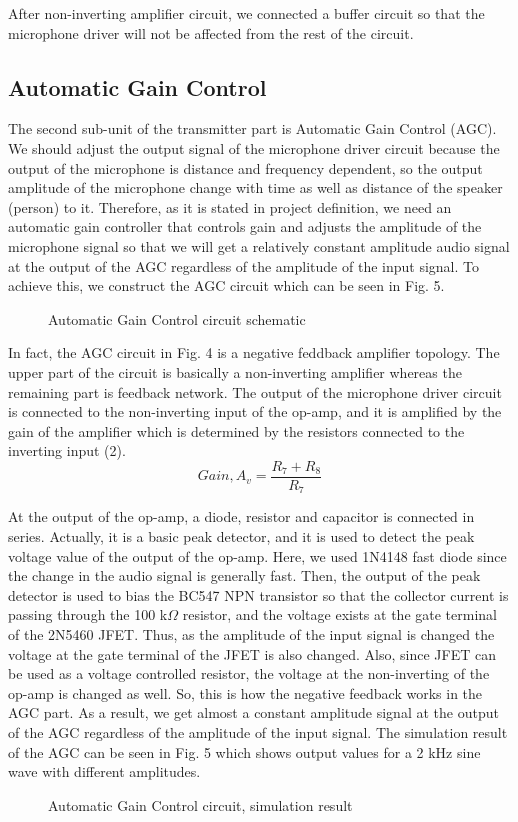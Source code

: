 \documentclass[conference]{IEEEtran}
\begin{document}
\par After non-inverting amplifier circuit, we connected a buffer circuit so that the microphone driver will not be affected from the rest of the circuit. 
\subsection{Automatic Gain Control}
The second sub-unit of the transmitter part is Automatic Gain Control (AGC). We should adjust the output signal of the microphone driver circuit because the output of the microphone is distance and frequency dependent, so the output amplitude of the microphone change with time as well as distance of the speaker (person) to it. Therefore, as it is stated in project definition, we need an automatic gain controller that controls gain and adjusts the amplitude of the microphone signal so that we will get a relatively constant amplitude audio signal at the output of the AGC regardless of the amplitude of the input signal. To achieve this, we construct the AGC circuit which can be seen in Fig. 5.
 \begin{figure}[H]
   \centerline{}
    \caption{Automatic Gain Control circuit schematic}
\end{figure}
\par In fact, the AGC circuit in Fig. 4 is a negative feddback amplifier topology. The upper part of the circuit is basically a non-inverting amplifier whereas the remaining part is feedback network. The output of the microphone driver circuit is connected to the non-inverting input of the op-amp, and it is amplified by the gain of the amplifier which is determined by the resistors connected to the inverting input (2). 
\begin{equation}\label{eq:2}
        Gain, A_v = \frac{R_7+R_8}{R_7} 
 \end{equation}
\par At the output of the op-amp, a diode, resistor and capacitor is connected in series. Actually, it is a basic peak detector, and it is used to detect the peak voltage value of the output of the op-amp. Here, we used 1N4148 fast diode \cite{1N4148} since the change in the audio signal is generally fast. Then, the output of the peak detector is used to bias the BC547 NPN transistor so that the collector current is passing through the 100 k\(\Omega\) resistor, and the voltage exists at the gate terminal of the 2N5460 JFET. Thus, as the amplitude of the input signal is changed the voltage at the gate terminal of the JFET is also changed. Also, since JFET can be used as a voltage controlled resistor, the voltage at the non-inverting of the op-amp is changed as well. So, this is how the negative feedback works in the AGC part. As a result, we get almost a constant amplitude signal at the output of the AGC regardless of the amplitude of the input signal. The simulation result of the AGC can be seen in Fig. 5 which shows output values for a 2 kHz sine wave with different amplitudes.
 \begin{figure}[H]
   \centerline{}
    \caption{Automatic Gain Control circuit, simulation result}
\end{figure}
\end{document}
